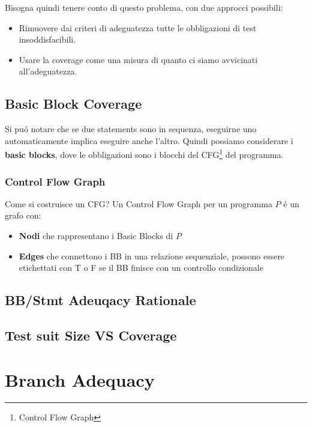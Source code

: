 Bisogna quindi tenere conto di questo problema, con due approcci possibili:
\begin{itemize}
    \item Rimuovere dai criteri di adeguatezza tutte le obbligazioni di test insoddisfacibili.
    \item Usare la coverage come una misura di quanto ci siamo avvicinati all'adeguatezza.
\end{itemize}

\subsection{Basic Block Coverage}
Si puó notare che se due statements sono in sequenza, eseguirne uno automaticamente implica eseguire anche l'altro.
Quindi possiamo considerare i \textbf{basic blocks}, dove le obbligazioni sono i blocchi del CFG\footnote{Control Flow Graph} del programma.


\subsubsection{Control Flow Graph}
Come si costruisce un CFG?
Un Control Flow Graph per un programma $P$ é un grafo con:
\begin{itemize}
    \item \textbf{Nodi} che rappresentano i Basic Blocks di $P$
    \item \textbf{Edges} che connettono i BB in una relazione sequenziale, possono essere etichettati con T o F se il BB finisce con un controllo condizionale
\end{itemize}

\subsection{BB/Stmt Adeuqacy Rationale}

\subsection{Test suit Size VS Coverage}

\section{Branch Adequacy}